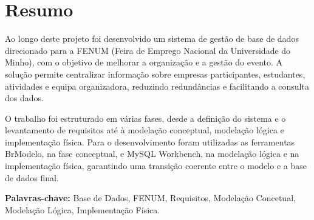 \documentclass[12pt,a4paper]{article}
\begin{document}
\section*{Resumo}

\vspace{0.4cm}

\begin{minipage}{0.96\textwidth}
\small
Ao longo deste projeto foi desenvolvido um sistema de gestão de base de dados direcionado para a FENUM (Feira de Emprego Nacional da Universidade do Minho), com o objetivo de melhorar a organização e a gestão do evento. A solução permite centralizar informação sobre empresas participantes, estudantes, atividades e equipa organizadora, reduzindo redundâncias e facilitando a consulta dos dados.

O trabalho foi estruturado em várias fases, desde a definição do sistema e o levantamento de requisitos até à modelação conceptual, modelação lógica e implementação física. Para o desenvolvimento foram utilizadas as ferramentas BrModelo, na fase conceptual, e MySQL Workbench, na modelação lógica e na implementação física, garantindo uma transição coerente entre o modelo e a base de dados final.
\end{minipage}

\vspace{0.8cm}

\noindent\textbf{Palavras-chave:} Base de Dados, FENUM, Requisitos, Modelação Concetual, Modelação Lógica, Implementação Física.
\newpage

\tableofcontents
\newpage

\listoffigures
\newpage

\listoftables
\newpage

\hypersetup{pageanchor=true}
\setcounter{page}{1}

\end{document}
